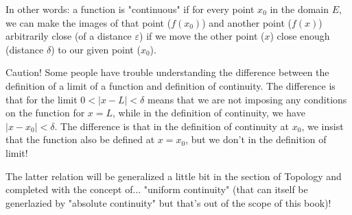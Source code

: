 	In other words: a function is "continuous" if for every point $x_0$ in the domain $E$, we can make the images of that point ($f(x_0)$) and another point ($f(x)$) arbitrarily close (of a distance $\varepsilon$) if we move the other point ($x$) close enough (distance $\delta$) to our given point ($x_0$).
	
	\begin{tcolorbox}[enhanced,colback=red!5!white,colframe=black!50!red,boxrule=1pt,arc=0pt,outer arc=0pt,drop lifted shadow,after skip=10pt plus 2pt]
		\bcbombe Caution! Some people have trouble understanding the difference between the definition of a limit of a function and definition of continuity. The difference is that for the limit $0<|x-L|<\delta$ means that we are not imposing any conditions on the function for $x=L$, while in the definition of continuity, we have $|x-x_0|<\delta$. The difference is that in the definition of continuity at $x_0$, we insist that the function also be defined at $x=x_0$, but we don't in the definition of limit!
		\end{tcolorbox}
	
	The latter relation will be generalized a little bit in the section of Topology and completed with the concept of... "uniform continuity" (that can itself be generlazied by "absolute continuity" but that's out of the scope of this book)!
	
